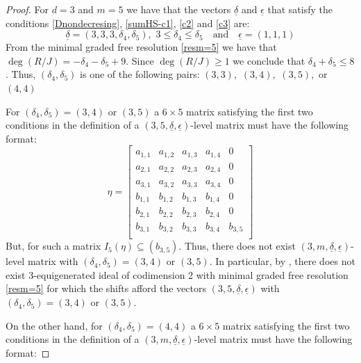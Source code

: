 \documentclass[11pt]{amsart} %
\theoremstyle{definition}
\begin{document}
\begin{proof} For $d=3$ and $m=5$ we have that the vectors $\underline{\delta}$ and  $\underline{\epsilon}$ that  satisfy the conditions \eqref{Dnondecresing}, \eqref{sumHS-c1}, \eqref{c2} and \eqref{c3} are:
	$$\underline{\delta}=(3,3,3,\delta_4,\delta_5),\,\, 3\leq \delta_4\leq\delta_5\quad\mbox{and}\quad \underline{\epsilon}=(1,1,1)$$
	From the minimal graded free resolution \eqref{resm=5} we have that $\deg(R/J)=-\delta_4-\delta_5+9$. Since $\deg(R/J)\geq 1$ we conclude that $\delta_4+\delta_5\leq 8$.  Thus, $(\delta_4,\delta_5)$ is one of the following pairs: $(3,3),$ $(3,4),$ $(3,5),$ or $(4,4)$  
	
	For $(\delta_4,\delta_5)=(3,4)$ or $(3,5)$ a $6\times 5$ matrix satisfying the first two conditions in the definition
	of a $(3,5,\underline{\delta},\underline{\epsilon})$-level matrix
	must have the following format:
	$$\eta=\left[\begin{matrix}
		a_{1,1}&a_{1,2}&a_{1,3}&a_{1,4}&0\\
		a_{2,1}&a_{2,2}&a_{2,3}&a_{2,4}&0\\
		a_{3,1}&a_{3,2}&a_{3,3}&a_{3,4}&0\\
		b_{1,1}&b_{1,2}&b_{1,3}&b_{1,4}&0\\
		b_{2,1}&b_{2,2}&b_{2,3}&b_{2,4}&0\\
		b_{3,1}&b_{3,2}&b_{3,3}&b_{3,4}&b_{3,5}\\
	\end{matrix}\right]$$ 
But, for such a matrix $I_5(\eta)\subseteq(b_{3,5})$. Thus, there does not exist  $(3,m,\underline{\delta},\underline{\epsilon})$-level matrix with $(\delta_4,\delta_5)=(3,4)$ or $(3,5)$.  In particular, by \cite[Theorem 1.3]{BFRS}, there does not exist $3$-equigenerated ideal of codimension 2  with minimal graded free resolution \eqref{resm=5}  for which the shifts  afford the
vectors $(3,5,\underline{\delta},\underline{\epsilon})$ with  $(\delta_4,\delta_5)=(3,4)$ or $(3,5)$. 

On the other hand,	for $(\delta_4,\delta_5)=(4,4)$  a $6\times 5$ matrix satisfying the first two conditions in the definition
of a $(3,m,\underline{\delta},\underline{\epsilon})$-level matrix
must have the following format:


\end{proof}
\end{document}
